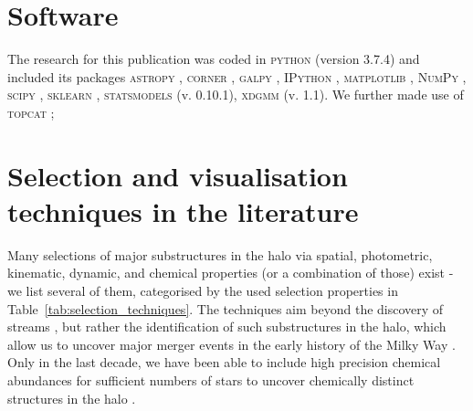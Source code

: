 \documentclass[fleqn,usenatbib]{mnras}
\begin{document}
\section*{Software}

The research for this publication was coded in \textsc{python} (version 3.7.4) and included its packages
\textsc{astropy} \citep[v. 3.2.2;][]{Robitaille2013,PriceWhelan2018},
\textsc{corner} \citep[v. 2.0.1;][]{corner},
\textsc{galpy} \citep[version 1.6.0;][]{Bovy2015},
\textsc{IPython} \citep[v. 7.8.0;][]{ipython},
\textsc{matplotlib} \citep[v. 3.1.3;][]{matplotlib},
\textsc{NumPy} \citep[v. 1.17.2;][]{numpy},
\textsc{scipy} \citep[version 1.3.1;][]{scipy},
\textsc{sklearn} \citep[v. 0.21.3;][]{scikit-learn},
\textsc{statsmodels} (v. 0.10.1),
\textsc{xdgmm} (v. 1.1).
We further made use of \textsc{topcat} \citep[version 4.7;][]{Taylor2005};



\appendix

\section{Selection and visualisation techniques in the literature} \label{sec:selection_techniques}


Many selections of major substructures in the halo via spatial, photometric, kinematic, dynamic, and chemical properties (or a combination of those) exist - we list several of them, categorised by the used selection properties in Table~\ref{tab:selection_techniques}. The techniques aim beyond the discovery of streams \citep[e.g.][]{Helmi1999,Grillmair2006,Belokurov2006}, but rather the identification of such substructures in the halo, which allow us to uncover major merger events in the early history of the Milky Way \citep[see][for a review]{Helmi2020}. Only in the last decade, we have been able to include high precision chemical abundances \cite[for a review see][]{Nissen2018} for sufficient numbers of stars to uncover chemically distinct structures in the halo \citep[e.g.][]{Nissen2010, Nissen2011}. 
\end{document}
